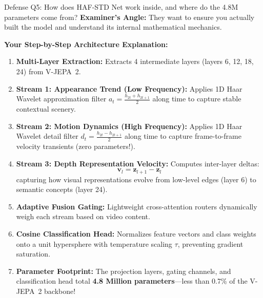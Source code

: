 \documentclass[a4paper, 11pt]{article}
\begin{document}
\begin{defensebox}{Defense Q5: How does HAF-STD Net work inside, and where do the 4.8M parameters come from?}
\textbf{Examiner's Angle:} They want to ensure you actually built the model and understand its internal mathematical mechanics.

\textbf{Your Step-by-Step Architecture Explanation:}
\begin{enumerate}
    \item \textbf{Multi-Layer Extraction:} Extracts 4 intermediate layers (layers 6, 12, 18, 24) from V-JEPA~2.
    \item \textbf{Stream 1: Appearance Trend (Low Frequency):} Applies 1D Haar Wavelet approximation filter $a_t = \frac{h_{2t} + h_{2t+1}}{2}$ along time to capture stable contextual scenery.
    \item \textbf{Stream 2: Motion Dynamics (High Frequency):} Applies 1D Haar Wavelet detail filter $d_t = \frac{h_{2t} - h_{2t+1}}{2}$ along time to capture frame-to-frame velocity transients (zero parameters!).
    \item \textbf{Stream 3: Depth Representation Velocity:} Computes inter-layer deltas:
    \[
    \mathbf{v}_l = \mathbf{z}_{l+1} - \mathbf{z}_l
    \]
    capturing how visual representations evolve from low-level edges (layer 6) to semantic concepts (layer 24).
    \item \textbf{Adaptive Fusion Gating:} Lightweight cross-attention routers dynamically weigh each stream based on video content.
    \item \textbf{Cosine Classification Head:} Normalizes feature vectors and class weights onto a unit hypersphere with temperature scaling $\tau$, preventing gradient saturation.
    \item \textbf{Parameter Footprint:} The projection layers, gating channels, and classification head total \textbf{4.8 Million parameters}—less than 0.7\% of the V-JEPA~2 backbone!
\end{enumerate}
\end{defensebox}
\end{document}
